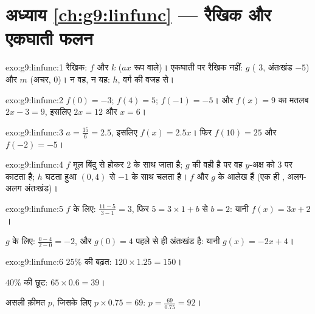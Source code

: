 \section*{अध्याय \ref{ch:g9:linfunc} --- रैखिक और एकघाती फलन}

\begin{solution}{exo:g9:linfunc:1}
रैखिक: $f$ और $k$ ($ax$ रूप वाले)। एकघाती पर रैखिक नहीं: $g$ (
$3$, अंतःखंड $-5$) और $m$ (अचर,  $0$)। न वह, न यह: $h$, वर्ग की
वजह से।
\end{solution}

\begin{solution}{exo:g9:linfunc:2}
$f(0) = -3$; $f(4) = 5$; $f(-1) = -5$। और $f(x) = 9$ का मतलब
$2x - 3 = 9$, इसलिए $2x = 12$ और $x = 6$।
\end{solution}

\begin{solution}{exo:g9:linfunc:3}
$a = \frac{15}{6} = 2.5$, इसलिए $f(x) = 2.5x$। फिर $f(10) = 25$ और
$f(-2) = -5$।
\end{solution}

\begin{solution}{exo:g9:linfunc:4}
$f$ मूल बिंदु से होकर  $2$ के साथ जाता है; $g$ की  वही है पर
वह $y$-अक्ष को $3$ पर काटता है; $h$ घटता हुआ $(0, 4)$ से  $-1$ के
साथ चलता है। $f$ और $g$ के आलेख \emph{} हैं (एक ही ,
अलग-अलग अंतःखंड)।
\end{solution}

\begin{solution}{exo:g9:linfunc:5}
$f$ के लिए:  $\frac{11 - 5}{3 - 1} = 3$, फिर $5 = 3 \times 1 + b$
से $b = 2$: यानी $f(x) = 3x + 2$।

$g$ के लिए:  $\frac{0 - 4}{2 - 0} = -2$, और $g(0) = 4$ पहले से ही
अंतःखंड है: यानी $g(x) = -2x + 4$।
\end{solution}

\begin{solution}{exo:g9:linfunc:6}
$25\%$ की बढ़त: $120 \times 1.25 = 150$।

$40\%$ की छूट: $65 \times 0.6 = 39$।

असली क़ीमत $p$, जिसके लिए $p \times 0.75 = 69$:
$p = \frac{69}{0.75} = 92$।
\end{solution}

